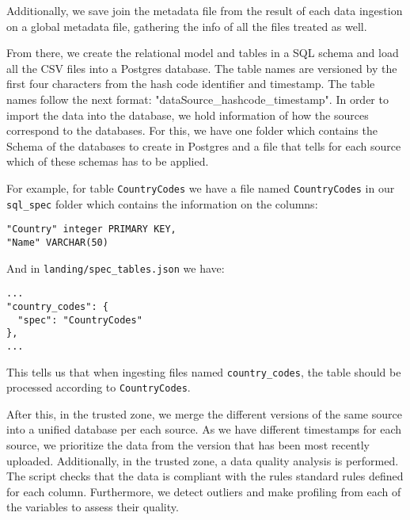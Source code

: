 Additionally, we save join the metadata file from the result of each data ingestion on a global metadata file, gathering the info of all the files treated as well.

From there, we create the relational model and tables in a SQL schema and load all the CSV files into a Postgres database. The table names are versioned by the first four characters from the hash code identifier and timestamp. The table names follow the next format: "dataSource\_hashcode\_timestamp".
In order to import the data into the database, we hold information of how the sources correspond to the
databases. For this, we have one folder which contains the Schema of the databases to create in Postgres
and a file that tells for each source which of these schemas has to be applied.

For example, for table \texttt{CountryCodes} we have a file named \texttt{CountryCodes} in our
\texttt{sql\_spec} folder which contains the information on the columns:

\begin{verbatim}
"Country" integer PRIMARY KEY,
"Name" VARCHAR(50)
\end{verbatim}

And in \texttt{landing/spec\_tables.json} we have:
\begin{verbatim}
...
"country_codes": {
  "spec": "CountryCodes"
},
...
\end{verbatim}

This tells us that when ingesting files named \texttt{country\_codes}, the table should be processed
according to \texttt{CountryCodes}.

After this, in the trusted zone, we merge the different versions of the same source into a unified database per each source. As we have different timestamps for each source, we prioritize the data from the version that has been most recently uploaded. Additionally, in the trusted zone, a data quality analysis is performed. The script checks that the data is compliant with the rules standard rules defined for each column. Furthermore, we detect outliers and make profiling from each of the variables to assess their quality.
